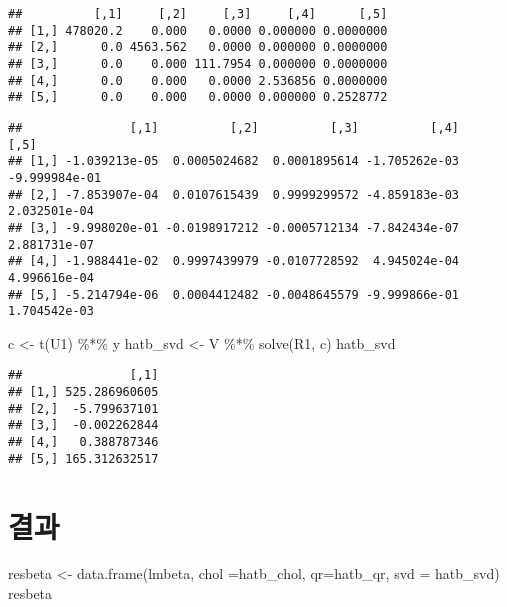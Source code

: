 \documentclass[
]{book}
\newenvironment{Shaded}{\begin{snugshade}}{\end{snugshade}}
\newcommand{\AttributeTok}[1]{\textcolor[rgb]{0.77,0.63,0.00}{#1}}
\newcommand{\FunctionTok}[1]{\textcolor[rgb]{0.00,0.00,0.00}{#1}}
\newcommand{\NormalTok}[1]{#1}
\newcommand{\OtherTok}[1]{\textcolor[rgb]{0.56,0.35,0.01}{#1}}
\newcommand{\SpecialCharTok}[1]{\textcolor[rgb]{0.00,0.00,0.00}{#1}}
\begin{document}
\begin{verbatim}
##          [,1]     [,2]     [,3]     [,4]      [,5]
## [1,] 478020.2    0.000   0.0000 0.000000 0.0000000
## [2,]      0.0 4563.562   0.0000 0.000000 0.0000000
## [3,]      0.0    0.000 111.7954 0.000000 0.0000000
## [4,]      0.0    0.000   0.0000 2.536856 0.0000000
## [5,]      0.0    0.000   0.0000 0.000000 0.2528772
\end{verbatim}

\begin{Shaded}
\end{Shaded}

\begin{verbatim}
##               [,1]          [,2]          [,3]          [,4]          [,5]
## [1,] -1.039213e-05  0.0005024682  0.0001895614 -1.705262e-03 -9.999984e-01
## [2,] -7.853907e-04  0.0107615439  0.9999299572 -4.859183e-03  2.032501e-04
## [3,] -9.998020e-01 -0.0198917212 -0.0005712134 -7.842434e-07  2.881731e-07
## [4,] -1.988441e-02  0.9997439979 -0.0107728592  4.945024e-04  4.996616e-04
## [5,] -5.214794e-06  0.0004412482 -0.0048645579 -9.999866e-01  1.704542e-03
\end{verbatim}

\begin{Shaded}
\begin{Highlighting}[]
\NormalTok{c }\OtherTok{\textless{}{-}} \FunctionTok{t}\NormalTok{(U1) }\SpecialCharTok{\%*\%}\NormalTok{ y}
\NormalTok{hatb\_svd }\OtherTok{\textless{}{-}}\NormalTok{ V }\SpecialCharTok{\%*\%} \FunctionTok{solve}\NormalTok{(R1, c)}
\NormalTok{hatb\_svd}
\end{Highlighting}
\end{Shaded}

\begin{verbatim}
##               [,1]
## [1,] 525.286960605
## [2,]  -5.799637101
## [3,]  -0.002262844
## [4,]   0.388787346
## [5,] 165.312632517
\end{verbatim}

\hypertarget{uxacb0uxacfc}{%
\section{결과}\label{uxacb0uxacfc}}

\begin{Shaded}
\begin{Highlighting}[]
\NormalTok{resbeta }\OtherTok{\textless{}{-}} \FunctionTok{data.frame}\NormalTok{(lmbeta, }\AttributeTok{chol =}\NormalTok{hatb\_chol, }\AttributeTok{qr=}\NormalTok{hatb\_qr, }\AttributeTok{svd =}\NormalTok{ hatb\_svd)}
\NormalTok{resbeta}
\end{Highlighting}
\end{Shaded}
\end{document}
